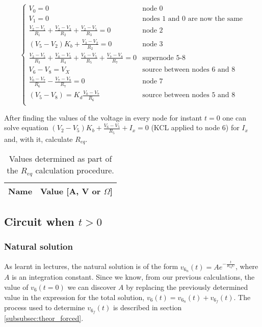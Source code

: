 \begin{equation}
  \begin{cases}
  V_0=0 & \mbox{node 0} \\
  V_1=0 & \mbox{nodes 1 and 0 are now the same} \\
  \frac{V_2-V_1}{R_1}+\frac{V_2-V_3}{R_2}+\frac{V_2-V_5}{R_3} = 0 & \mbox{node 2} \\
  (V_5-V_2)K_b + \frac{V_3-V_2}{R_2} = 0 & \mbox{node 3} \\
  \frac{V_2-V_5}{R_3} + \frac{V_0-V_5}{R_4} + \frac{V_6-V_5}{R_5} + \frac{V_7-V_8}{R_7} = 0 & \mbox{supernode 5-8} \\ 
  V_6-V_8 = V_X & \mbox{source between nodes 6 and 8} \\
  \frac{V_0-V_7}{R_6} - \frac{V_7-V_8}{R_7} = 0 & \mbox{node 7} \\
  (V_5-V_8) = K_d \frac{V_0-V_7}{R_6} & \mbox{source between nodes 5 and 8} \\
  \end{cases}
\end{equation}

After finding the values of the voltage in every node for instant $t=0$ one can solve equation $(V_2-V_5)K_b + \frac{V_6-V_5}{R_5} + I_x = 0$ (KCL applied to node 6) for $I_x$ and, with it, calculate $R_{eq}$.


\begin{table}[H]
  \centering
  \begin{tabular}{|c|c|}
    \hline    
    {\bf Name} & {\bf Value [A, V or $\Omega$]} \\ \hline
    
  \end{tabular}
  \caption{Values determined as part of the $R_{eq}$ calculation procedure.}
  \label{tab:t=0}
\end{table}



\subsection{Circuit when $t>0$}

\subsubsection{Natural solution}  %
As learnt in lectures, the natural solution is of the form $v_{6_{n}}(t) = A e^{-\frac{t}{R_{eq}C}}$, where $A$ is an integration constant.
Since we know, from our previous calculations, the value of $v_{6}(t=0)$ we can discover $A$ by replacing the previously determined value in the expression for the total solution, $v_6(t) = v_{6_n}(t) + v_{6_f}(t)$. The process used to determine $v_{6_f}(t)$ is described in section \ref{subsubsec:theor_forced}. 

